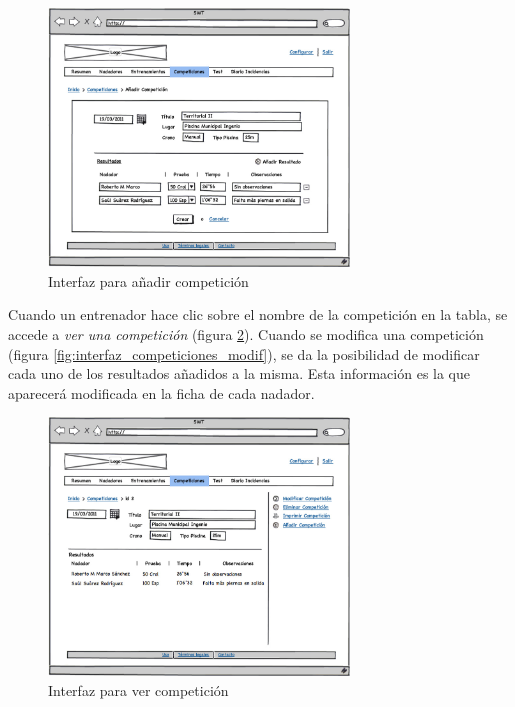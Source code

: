 		\begin{figure}[H]
		  \centering
		    \includegraphics[width=8cm]{./eps/p_interfaz/15_Competiciones_new.eps}
		  \caption{Interfaz para añadir competición}
		  \label{fig:interfaz_competiciones_new}
		\end{figure}

Cuando un entrenador hace clic sobre el nombre de la competición en la tabla, se accede a {\it ver una competición} (figura \ref{fig:interfaz_competiciones_show}). Cuando se modifica una competición (figura \ref{fig:interfaz_competiciones_modif}), se da la posibilidad de modificar cada uno de los resultados añadidos a la misma. Esta información es la que aparecerá modificada en la ficha de cada nadador.

		\begin{figure}[H]
		  \centering
		    \includegraphics[width=8cm]{./eps/p_interfaz/16_Competiciones_show.eps}
		  \caption{Interfaz para ver competición}
		  \label{fig:interfaz_competiciones_show}
		\end{figure}


